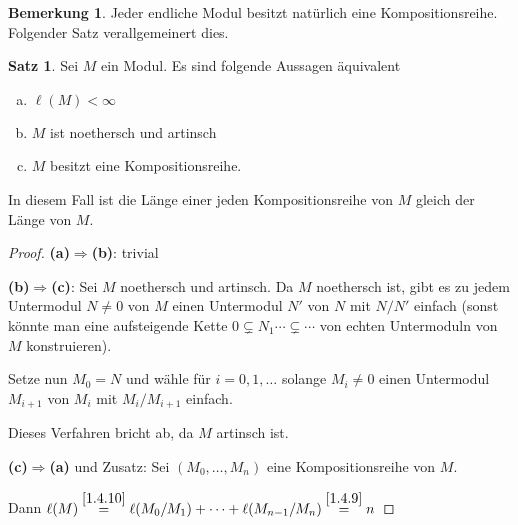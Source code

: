 \documentclass[
twoside=semi,
fontsize=12,
DIV=12, 
cleardoublepage=current,
leqno,
headings=optiontoheadandtoc, 
toc=idx
]{scrbook}
\theoremstyle{definition}
\newtheorem{bemerkung}[definition]{Bemerkung}
\newtheorem{satz}[definition]{Satz}
\begin{document}
	\begin{bemerkung}\label{1.4.12}\hfill\newline
		Jeder endliche Modul besitzt nat\"urlich eine Kompositionsreihe. Folgender Satz verallgemeinert dies.
	\end{bemerkung}

	\begin{satz}\label{1.4.13}\hfill\newline
		Sei $M$ ein Modul. Es sind folgende Aussagen \"aquivalent
		
		\begin{enumerate}[(a)]
			\item $\ell(M) < \infty$
			\item $M$ ist noethersch und artinsch
			\item $M$ besitzt eine Kompositionsreihe.
		\end{enumerate}
		
		\noindent In diesem Fall ist die L\"ange einer jeden Kompositionsreihe von $M$ gleich der L\"ange von $M$.
		
		\begin{proof}\hfill\newline
			\textbf{(a)$\Longrightarrow$(b)}: trivial
			
			\medskip\noindent
			\textbf{(b)$\Longrightarrow$(c)}: Sei $M$ noethersch und artinsch. Da $M$ noethersch ist, gibt es zu jedem Untermodul $N \neq 0$ von $M$ einen Untermodul $N'$ von $N$ mit $N/N'$ einfach (sonst k\"onnte man eine aufsteigende Kette $0 \subsetneq N_1 \cdots \subsetneq  \cdots$ von echten Untermoduln von $M$ konstruieren).
			
			\noindent Setze nun $M_0 = N$ und w\"ahle f\"ur $i = 0, 1, \dots$ solange $M_i \neq 0$ einen Untermodul $M_{i+1}$ von $M_i$ mit $M_i/M_{i+1}$ einfach.
			
			\noindent Dieses Verfahren bricht ab, da $M$ artinsch ist.
			
			\medskip\noindent
			\textbf{(c)$\Longrightarrow$(a)} und Zusatz: 
			Sei $(M_0, \dots, M_n)$ eine Kompositionsreihe von $M$. 
			
			\noindent Dann $\ell(M) \overset{\ref{1.4.10}}{=} \ell(M_0/M_1) + \cdots + \ell(M_{n-1}/M_n) \overset{\ref{1.4.9}}{=} n$
		\end{proof}
	\end{satz}
\end{document}
